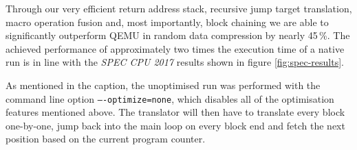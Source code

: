Through our very efficient return address stack, recursive jump target translation, macro operation fusion and, most importantly, block chaining we are able to significantly outperform QEMU in random data compression by nearly 45\,\%.
The achieved performance of approximately two times the execution time of a native run is in line with the \textit{SPEC CPU 2017} results shown in figure \ref{fig:spec-results}.

As mentioned in the caption, the unoptimised run was performed with the command line option \texttt{----optimize=none}, which disables all of the optimisation features mentioned above.
The translator will then have to translate every block one-by-one, jump back into the main loop on every block end and fetch the next position based on the current program counter.






















